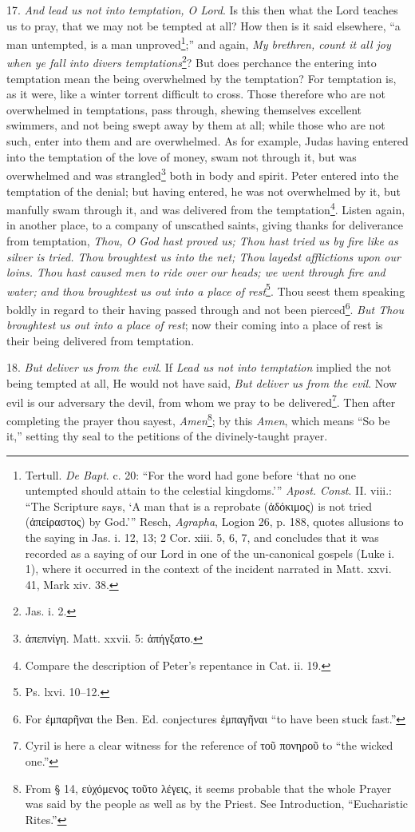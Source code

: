 17. \emph{And lead us not into temptation, O Lord}. Is this then what the Lord teaches us to pray, that we may not be tempted at all? How then is it said elsewhere, “a man untempted, is a man unproved\footnote{Tertull. \emph{De Bapt}. c. 20: “For the word had gone before ‘that no one untempted should attain to the celestial kingdoms.’” \emph{Apost. Const}. II. viii.: “The Scripture says, ‘A man that is a reprobate (\textgreek{ἀδόκιμος}) is not tried (\textgreek{ἀπείραστος}) by God.’” Resch, \emph{Agrapha}, Logion 26, p. 188, quotes allusions to the saying in Jas. i. 12, 13; 2 Cor. xiii. 5, 6, 7, and concludes that it was recorded as a saying of our Lord in one of the un-canonical gospels (Luke i. 1), where it occurred in the context of the incident narrated in Matt. xxvi. 41, Mark xiv. 38.};” and again, \emph{My brethren, count it all joy when ye fall into divers temptations}\footnote{Jas. i. 2.}? But does perchance the entering into temptation mean the being overwhelmed by the temptation? For temptation is, as it were, like a winter torrent difficult to cross. Those therefore who are not overwhelmed in temptations, pass through, shewing themselves excellent swimmers, and not being swept away by them at all; while those who are not such, enter into them and are overwhelmed. As for example, Judas having entered into the temptation of the love of money, swam not through it, but was overwhelmed and was strangled\footnote{\textgreek{ἀπεπνίγη}. Matt. xxvii. 5: \textgreek{ἀπήγξατο}.} both in body and spirit. Peter entered into the temptation of the denial; but having entered, he was not overwhelmed by it, but manfully swam through it, and was delivered from the temptation\footnote{Compare the description of Peter’s repentance in Cat. ii. 19.}. Listen again, in another place, to a company of unscathed saints, giving thanks for deliverance from temptation, \emph{Thou, O God hast proved us; Thou hast tried us by fire like as silver is tried. Thou broughtest us into the net; Thou layedst afflictions upon our loins. Thou hast caused men to ride over our heads; we went through fire and water; and thou broughtest us out into a place of rest}\footnote{Ps. lxvi. 10–12.}. Thou seest them speaking boldly in regard to their having passed through and not been pierced\footnote{For \textgreek{ἐμπαρῆναι} the Ben. Ed. conjectures \textgreek{ἐμπαγῆναι} “to have been stuck fast.”}. \emph{But Thou broughtest us out into a place of rest}; now their coming into a place of rest is their being delivered from temptation.

18. \emph{But deliver us from the evil}. If \emph{Lead us not into temptation} implied the not being tempted at all, He would not have said, \emph{But deliver us from the evil}. Now evil is our adversary the devil, from whom we pray to be delivered\footnote{Cyril is here a clear witness for the reference of \textgreek{τοῦ πονηροῦ} to “the wicked one.”}. Then after completing the prayer thou sayest, \emph{Amen}\footnote{From § 14, \textgreek{εὐχόμενος τοῦτο λέγεις}, it seems probable that the whole Prayer was said by the people as well as by the Priest. See Introduction, “Eucharistic Rites.”}; by this \emph{Amen}, which means “So be it,” setting thy seal to the petitions of the divinely-taught prayer.

